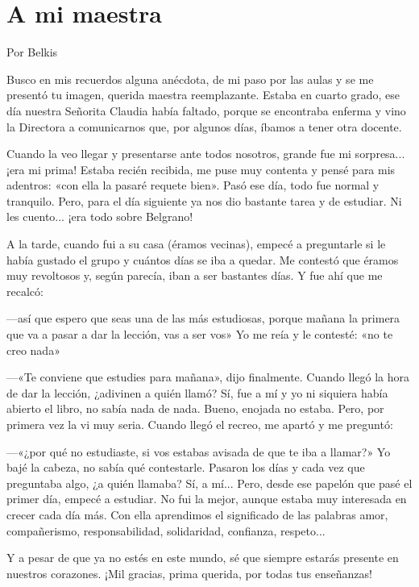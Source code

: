 \documentclass[11pt,twoside,openright,a5paper]{book}
\begin{document}
\section*{A mi maestra}

\begin{flushright}Por Belkis\end{flushright}

Busco en mis recuerdos alguna anécdota, de mi paso por las aulas y se me presentó tu imagen, querida maestra reemplazante. Estaba en cuarto grado, ese día nuestra Señorita Claudia había faltado, porque se encontraba enferma y vino la Directora a comunicarnos que, por algunos días, íbamos a tener otra docente.

Cuando la veo llegar y presentarse ante todos nosotros, grande fue mi sorpresa... ¡era mi prima! Estaba recién recibida, me puse muy contenta y pensé para mis adentros: «con ella la pasaré requete bien». Pasó ese día, todo fue normal y tranquilo. Pero, para el día siguiente ya nos dio bastante tarea y de estudiar. Ni les cuento... ¡era todo sobre Belgrano!

A la tarde, cuando fui a su casa (éramos vecinas), empecé a preguntarle si le había gustado el grupo y cuántos días se iba a quedar. Me contestó que éramos muy revoltosos y, según parecía,  iban a ser bastantes días. Y fue ahí que me recalcó: 

---así que espero que seas una de las más estudiosas, porque mañana la primera que va a pasar a dar la lección, vas a ser vos»
Yo me reía y le contesté: «no te creo nada»

---«Te conviene que estudies para mañana», dijo finalmente.
Cuando llegó la hora de dar la lección, ¿adivinen a quién llamó? Sí, fue a mí y yo ni siquiera había abierto el libro, no sabía nada de nada. Bueno, enojada no estaba. Pero, por primera vez la vi muy seria. Cuando llegó el recreo, me apartó y me preguntó: 

---«¿por qué no estudiaste, si vos estabas avisada de que te iba a llamar?» Yo bajé la cabeza, no sabía qué contestarle.
Pasaron los días y cada vez que preguntaba algo, ¿a quién llamaba? Sí, a mí...
Pero, desde ese papelón que pasé el primer día, empecé a estudiar. No fui la mejor, aunque estaba muy interesada en crecer cada día más. Con ella aprendimos el significado de las palabras amor, compañerismo, responsabilidad, solidaridad, confianza, respeto...

Y a pesar de que ya no estés en este mundo, sé que siempre estarás presente en nuestros corazones. ¡Mil gracias, prima querida, por todas tus enseñanzas!
\end{document}
